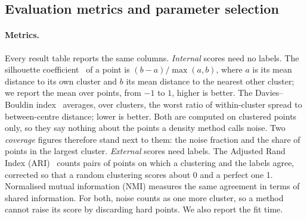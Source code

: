 \subsection{Evaluation metrics and parameter selection}\label{sec:protocol}


\paragraph{Metrics.}
Every result table reports the same columns. \emph{Internal} scores need no labels. The silhouette
coefficient~\cite{rousseeuw1987} of a point is $(b-a)/\max(a,b)$, where $a$ is its mean distance to its
own cluster and $b$ its mean distance to the nearest other cluster; we report the mean over points, from
$-1$ to $1$, higher is better. The Davies--Bouldin index~\cite{davies1979} averages, over clusters, the
worst ratio of within-cluster spread to between-centre distance; lower is better. Both are computed on
clustered points only, so they say nothing about the points a density method calls noise. Two
\emph{coverage} figures therefore stand next to them: the noise fraction and the share of points in the
largest cluster. \emph{External} scores need labels. The Adjusted Rand Index (ARI)~\cite{hubert1985} counts
pairs of points on which a clustering and the labels agree, corrected so that a random clustering scores
about 0 and a perfect one 1. Normalised mutual information (NMI) measures the same agreement in terms of
shared information. For both, noise counts as one more cluster, so a method cannot raise its score by
discarding hard points. We also report the fit time.

